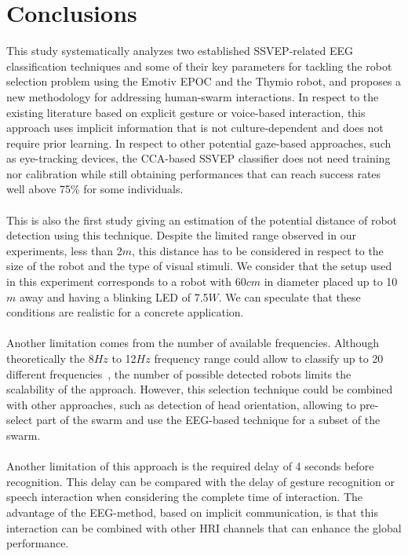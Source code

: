\documentclass[smallextended]{svjour3}
\begin{document}
\section{Conclusions}
This study systematically analyzes two established SSVEP-related EEG classification techniques and some of their key parameters for tackling the robot selection problem using the Emotiv EPOC and the Thymio robot, and proposes a new methodology for addressing human-swarm interactions. 
In respect to the existing literature based on explicit gesture or voice-based interaction, this approach uses implicit information that is not culture-dependent and does not require prior learning. 
In respect to other potential gaze-based approaches, such as eye-tracking devices, the CCA-based SSVEP classifier does not need training nor calibration while still obtaining performances that can reach success rates well above 75\% for some individuals.\\
\\
This is also the first study giving an estimation of the potential distance of robot detection using this technique.
Despite the limited range observed in our experiments, less than 2$m$, this distance has to be considered in respect to the size of the robot and the type of visual stimuli. We consider that the setup used in this experiment corresponds to a robot with 60$cm$ in diameter placed up to 10$m$ away and having a blinking LED of 7.5$W$. 
We can speculate that these conditions are realistic for a concrete application.\\
\\
Another limitation comes from the number of available frequencies.
Although theoretically the 8$Hz$ to 12$Hz$ frequency range could allow to classify up to 20 different frequencies~\cite{SSVEPfiability}, the number of possible detected robots limits the scalability of the approach. 
However, this selection technique could be combined with other approaches, such as detection of head orientation, allowing to pre-select part of the swarm and use the EEG-based technique for a subset of the swarm.\\
\\
Another limitation of this approach is the required delay of 4 seconds before recognition. This delay can be compared with the delay of gesture recognition or speech interaction when considering the complete time of interaction. The advantage of the EEG-method, based on implicit communication, is that this interaction can be combined with other HRI channels that can enhance the global performance.\\
\end{document}
